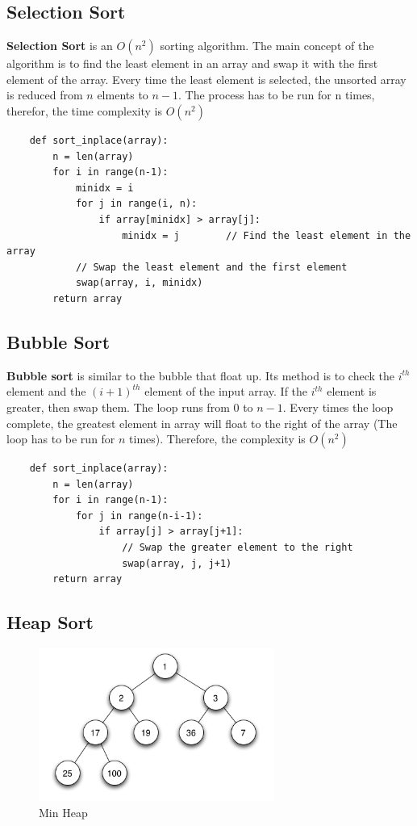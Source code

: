 \documentclass[12pt]{article}
\begin{document}
	\subsection{Selection Sort}
	
	\textbf{Selection Sort} is an $O(n^2)$ sorting algorithm. The main concept of the algorithm is to find the least element in an array and swap it with the first element of the array. Every time the least element is selected, the unsorted array is reduced from $n$ elments to $n-1$. The process has to be run for n times, therefor, the time complexity is $O(n^2)$
	
	\begin{verbatim}
	def sort_inplace(array):
	    n = len(array)
	    for i in range(n-1):
	        minidx = i
	        for j in range(i, n):
	            if array[minidx] > array[j]:
	                minidx = j        // Find the least element in the array
	        // Swap the least element and the first element
	        swap(array, i, minidx)
	    return array
	\end{verbatim}
	
	\subsection{Bubble Sort}
	
	\textbf{Bubble sort} is similar to the bubble that float up. Its method is to check the $i^{th}$ element and the $(i+1)^{th}$ element of the input array. If the $i^{th}$ element is greater, then swap them. The loop runs from $0$ to $n-1$. Every times the loop complete, the greatest element in array will float to the right of the array (The loop has to be run for $n$ times). Therefore, the complexity is $O(n^2)$
	
	\begin{verbatim}
	def sort_inplace(array):
	    n = len(array)
	    for i in range(n-1):
	        for j in range(n-i-1):
	            if array[j] > array[j+1]:
	                // Swap the greater element to the right
	                swap(array, j, j+1)
	    return array
	\end{verbatim}
	
	\subsection{Heap Sort}
	
	\begin{figure}[ht]
		\centering
		\includegraphics[height=5cm]{Min-heap.png}
		\caption{Min Heap}
		\label{fig:minHeap}
	\end{figure}
	
\end{document}
